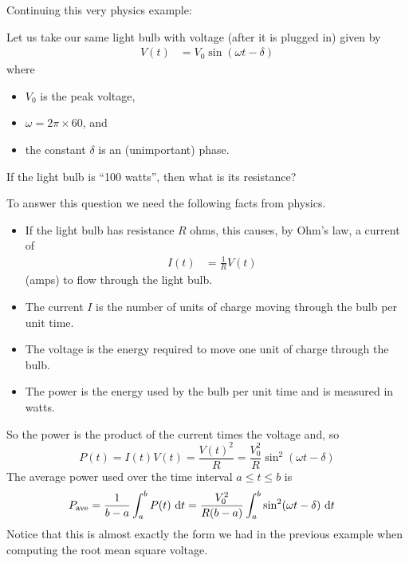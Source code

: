 Continuing this very physics example:
\begin{eg}\label{eg:AVpower}
Let us take our same light bulb with voltage (after it is plugged in) given by
\begin{align*}
 V(t) &= V_0\sin(\omega t-\delta)
\end{align*}
where
\begin{itemize}
\item $V_0$ is the peak voltage,
\item $\omega=2\pi\times 60$, and
\item the constant $\delta$ is an (unimportant) phase.
\end{itemize}
If the light bulb is ``100 watts'', then what is its resistance?

To answer this question we need the following facts from physics.
\begin{itemize}
\item
If the light bulb has resistance $R$ ohms, this causes, by Ohm's law, a current of
\begin{align*}
      I(t) &= \frac{1}{R} V(t) &
\end{align*}
(amps) to flow through the light bulb.
\item
The current $I$ is the number of units of charge moving through the bulb per unit time.
\item
The voltage is the energy required to move one unit of charge through the bulb.
\item
The power is the energy used by the bulb per unit time and is measured in watts.
\end{itemize}
So the power is the product of the current times the voltage and, so
\begin{equation*}
P(t)=I(t)V(t)
=\frac{V(t)^2}{R}
=\frac{V_0^2}{R}\sin^2(\omega t-\delta)
\end{equation*}
The average power used over the time interval $a\le t\le b$ is
\begin{align*}
P_{\mathrm{ave}} &= \frac{1}{b-a}\int_a^b P(t)\ \mathrm{d}t
        = \frac{V_0^2}{R(b-a)}\int_a^b \sin^2(\omega t-\delta)\ \mathrm{d}t
\end{align*}
Notice that this is almost exactly the form we had in the previous example when computing
the root mean square voltage.



\end{eg}
